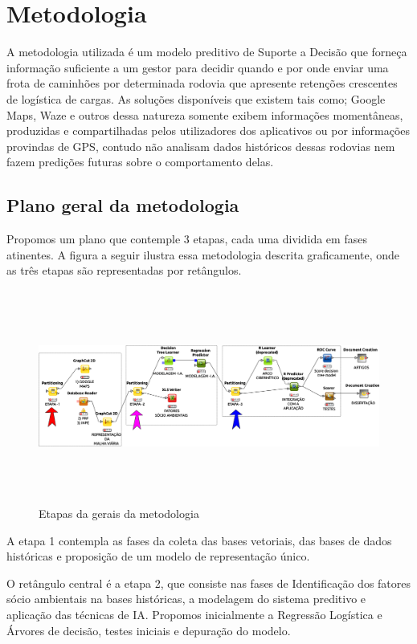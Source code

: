 \chapter{ Metodologia}\label{meto}

A metodologia utilizada é um modelo preditivo de Suporte a Decisão que forneça informação suficiente a um gestor para decidir quando e por onde 
enviar uma frota de caminhões por determinada rodovia que apresente retenções crescentes de logística de cargas. As soluções disponíveis que 
existem tais como; Google Maps, Waze e outros dessa natureza somente exibem informações momentâneas, produzidas e compartilhadas pelos utilizadores 
dos aplicativos ou por informações provindas de GPS, contudo não analisam dados históricos dessas rodovias nem fazem predições futuras sobre o 
comportamento delas. \\

\section{ Plano geral da metodologia}

Propomos um plano que contemple 3 etapas, cada uma dividida em fases atinentes. A figura a seguir ilustra essa metodologia descrita graficamente, onde as três etapas são representadas por retângulos.
 
\begin{figure}[ht]
\centering
\caption{Etapas da gerais da metodologia}
\includegraphics[width=160mm, height=70mm]{Figuras/BigData/Etapas.png}
\end{figure}

 A etapa 1 contempla as fases da coleta das bases vetoriais, das bases de dados históricas e proposição de um modelo de representação único.
 
 O retângulo central é a etapa 2, que consiste nas fases de Identificação dos fatores sócio ambientais na bases históricas, a modelagem do sistema preditivo e aplicação das técnicas de IA. Propomos inicialmente a Regressão Logística e Árvores de decisão, testes iniciais e depuração do modelo.
 
